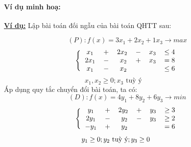 \documentclass{article}
\begin{document}
\paragraph{Ví dụ minh hoạ:}
\begin{flushleft}
    \textbf{\underline{Ví dụ:}} Lập bài toán đối ngẫu của bài toán QHTT sau:
\end{flushleft}
\begin{equation*}
    (P):f(x) = 3x_1+2x_2+1x_3 \longrightarrow max
\end{equation*}
\begin{equation*} \Bigg\{
    \begin{tabular}{c c c c c l}
        $x_1$ &$+$ & $2x_2$ & $-$ & $x_3$ &$\leq 4$  \\
        $2x_1$ &$-$ & \text{ }$x_2$   & $+$ & $x_3$ &$= 8$ \\
        $x_1$ &$-$ & \text{ }$x_2$   &  &  &$\leq 6$ \\
    \end{tabular}
\end{equation*}
\begin{equation*}
    \text{ }x_1,x_2 \geq 0 ; x_3 \text{ tuỳ ý}\hspace{2cm}
\end{equation*}
\hspace{0.4cm} Áp dụng quy tắc chuyển đổi bài toán, ta có:
\begin{equation*}
    (D):f(x) = 4y_1+8y_2+6y_3 \longrightarrow min
\end{equation*}
\begin{equation*} \Bigg\{
    \begin{tabular}{c c c c c l}
        $y_1$ &$+$ & $2y_2$ & $+$ & $y_3$ &$\geq 3$  \\
        $2y_1$ &$-$ & \text{ }$y_2$   & $-$ & $y_3$ &$\geq 2$ \\
        $-$$y_1$ &$+$ & \text{ }$y_2$   &  &  &$= 6$ \\
    \end{tabular}
\end{equation*}
\begin{equation*}
    \text{ }y_1 \geq 0 ; y_2 \text{ tuỳ ý}; y_3 \geq 0\hspace{1.3cm}
\end{equation*}
\end{document}

